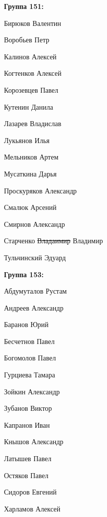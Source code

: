 \documentclass[a4paper, 12pt]{article}
\begin{document}
\begin{minipage}{0.45\textwidth}
  \def\baselinestretch{1.2}
  \textbf{Группа 151:}

  \it{

  Бирюков Валентин

  Воробьев Петр

  Калинов Алексей

  Когтенков Алексей

  Корозевцев Павел

  Кутенин Данила

  Лазарев Владислав
  
  Лукьянов Илья

  Мельников Артем

  Мусаткина Дарья

  Проскуряков Александр

  Смалюк Арсений

  Смирнов Александр

  Старченко \sout{Владаимир} Владимир

  Тульчинский Эдуард
  }
\end{minipage}
\hfill
\begin{minipage}{0.45\textwidth}
  \def\baselinestretch{1.2}

  \textbf{Группа 153:}
  \it{

  Абдумуталов Рустам

  Андреев Александр

  Баранов Юрий

  Бесчетнов Павел

  Богомолов Павел

  Гурциева Тамара

  Зойкин Александр

  Зубанов Виктор

  Капранов Иван

  Кнышов Александр

  Латышев Павел

  Остяков Павел

  Сидоров Евгений

  Харламов Алексей
  }
\end{minipage}
\end{document}
